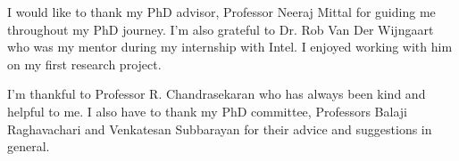 I would like to thank my PhD advisor, Professor Neeraj Mittal for guiding me throughout my PhD journey. I'm also grateful to Dr. Rob Van Der Wijngaart who was my mentor during my internship with Intel. I enjoyed working with him on my first research project.

I'm thankful to Professor R. Chandrasekaran who has always been kind and helpful to me. I also have to thank my PhD committee, Professors Balaji Raghavachari and Venkatesan Subbarayan for their advice and suggestions in general.
